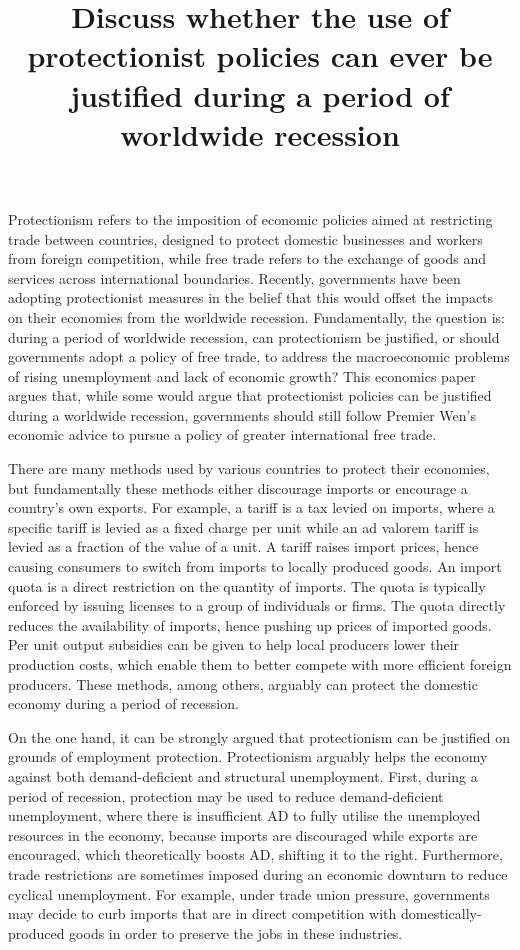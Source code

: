 \documentclass[11pt,a4paper]{article}
\begin{document}
\title{Discuss whether the use of protectionist policies can ever be justified during a period of worldwide recession}
\maketitle
Protectionism refers to the imposition of economic policies aimed at restricting trade between countries, designed to protect domestic businesses and workers from foreign competition, while free trade refers to the exchange of goods and services across international boundaries. Recently, governments have been adopting protectionist measures in the belief that this would offset the impacts on their economies from the worldwide recession. Fundamentally, the question is: during a period of worldwide recession, can protectionism be justified, or should governments adopt a policy of free trade, to address the macroeconomic problems of rising unemployment and lack of economic growth? This economics paper argues that, while some would argue that protectionist policies can be justified during a worldwide recession, governments should still follow Premier Wen’s economic advice to pursue a policy of greater international free trade.  

There are many methods used by various countries to protect their economies, but fundamentally these methods either discourage imports or encourage a country’s own exports.  For example, a tariff is a tax levied on imports, where a specific tariff is levied as a fixed charge per unit while an ad valorem tariff is levied as a fraction of the value of a unit. A tariff raises import prices, hence causing consumers to switch from imports to locally produced goods. An import quota is a direct restriction on the quantity of imports. The quota is typically enforced by issuing licenses to a group of individuals or firms. The quota directly reduces the availability of imports, hence pushing up prices of imported goods. Per unit output subsidies can be given to help local producers lower their production costs, which enable them to better compete with more efficient foreign producers. These methods, among others, arguably can protect the domestic economy during a period of recession. 

On the one hand, it can be strongly argued that protectionism can be justified on grounds of employment protection. Protectionism arguably helps the economy against both demand-deficient and structural unemployment. First, during a period of recession, protection may be used to reduce demand-deficient unemployment, where there is insufficient AD to fully utilise the unemployed resources in the economy, because imports are discouraged while exports are encouraged, which theoretically boosts AD, shifting it to the right. Furthermore, trade restrictions are sometimes imposed during an economic downturn to reduce cyclical unemployment. For example, under trade union pressure, governments may decide to curb imports that are in direct competition with domestically-produced goods in order to preserve the jobs in these industries. 
\end{document}
